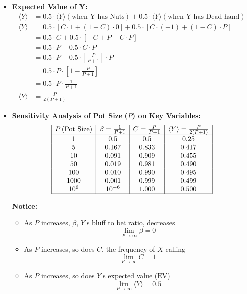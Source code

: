 \documentclass[12pt]{article}
\begin{document}
\begin{itemize}
\item \textbf{Expected Value of Y:}
    \begin{align*}
        \langle Y \rangle &= 0.5 \cdot \langle Y \rangle (\text{when Y has Nuts}) + 0.5 \cdot \langle Y \rangle (\text{when Y has Dead hand}) \\
        \langle Y \rangle &= 0.5 \cdot [C \cdot 1 + (1-C)\cdot 0] + 0.5 \cdot [C\cdot(-1) + (1-C)\cdot P] \\
        &= 0.5 \cdot C + 0.5 \cdot [-C + P - C \cdot P] \\
        &= 0.5 \cdot P - 0.5 \cdot C \cdot P \\
        &= 0.5 \cdot P - 0.5 \cdot \left[\frac{P}{P+1}\right] \cdot P \\
        &= 0.5 \cdot P \cdot \left[1 - \frac{P}{P+1}\right] \\
        &= 0.5 \cdot P \cdot \frac{1}{P+1} \\
        \langle Y \rangle &= \frac{P}{2(P+1)}
    \end{align*}

\item \textbf{Sensitivity Analysis of Pot Size (\(P\)) on Key Variables:}
\[
\begin{array}{|c|c|c|c|}
\hline
P \, \text{(Pot Size)} & \beta = \frac{1}{P+1} & C = \frac{P}{P+1} & \langle Y \rangle = \frac{P}{2(P+1)} \\
\hline
1 & 0.5 & 0.5 & 0.25 \\
5 & 0.167 & 0.833 & 0.417 \\
10 & 0.091 & 0.909 & 0.455 \\
50 & 0.019 & 0.981 & 0.490 \\
100 & 0.010 & 0.990 & 0.495 \\
1000 & 0.001 & 0.999 & 0.499 \\
10^6 & 10^{-6} & 1.000 & 0.500 \\
\hline
\end{array}
\]

\textbf{Notice:}
\begin{itemize}
    \item As \(P\) increases, $\beta$, $Y$'s bluff to bet ratio, decreases $$\lim_{P \to \infty} \beta = 0$$
    \item As \(P\) increases, so does \(C\), the frequency of $X$ calling \[\lim_{P \to \infty} C = 1\]
    \item As \(P\) increases, so does \(Y\)'s expected value (\(\text{EV}\)) \[\lim_{P \to \infty} \langle Y \rangle = 0.5\]
\end{itemize}


\end{itemize}
\end{document}
